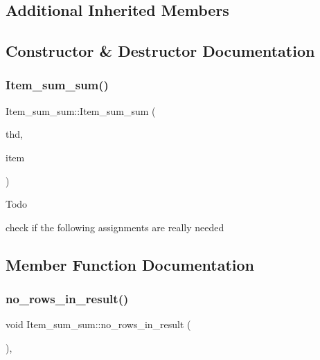 \subsection*{Additional Inherited Members}


\subsection{Constructor \& Destructor Documentation}
\mbox{\label{classItem__sum__sum_af259b3fb68c269dba5d29d7f1e2323eb}} 
\subsubsection{\texorpdfstring{Item\+\_\+sum\+\_\+sum()}{Item\_sum\_sum()}}
{\footnotesize\ttfamily Item\+\_\+sum\+\_\+sum\+::\+Item\+\_\+sum\+\_\+sum (\begin{DoxyParamCaption}\item[{T\+HD $\ast$}]{thd,  }\item[{\mbox{\hyperlink{classItem__sum__sum}{Item\+\_\+sum\+\_\+sum}} $\ast$}]{item }\end{DoxyParamCaption})}

\begin{DoxyRefDesc}{Todo}
\item[\mbox{\hyperlink{todo__todo000038}{Todo}}]check if the following assignments are really needed \end{DoxyRefDesc}


\subsection{Member Function Documentation}
\mbox{\label{classItem__sum__sum_aa610e5d4e5371dcea4625416d7d79d93}} 
\subsubsection{\texorpdfstring{no\+\_\+rows\+\_\+in\+\_\+result()}{no\_rows\_in\_result()}}
{\footnotesize\ttfamily void Item\+\_\+sum\+\_\+sum\+::no\+\_\+rows\+\_\+in\+\_\+result (\begin{DoxyParamCaption}{ }\end{DoxyParamCaption})\hspace{0.3cm}{\ttfamily [inline]}, {\ttfamily [virtual]}}

